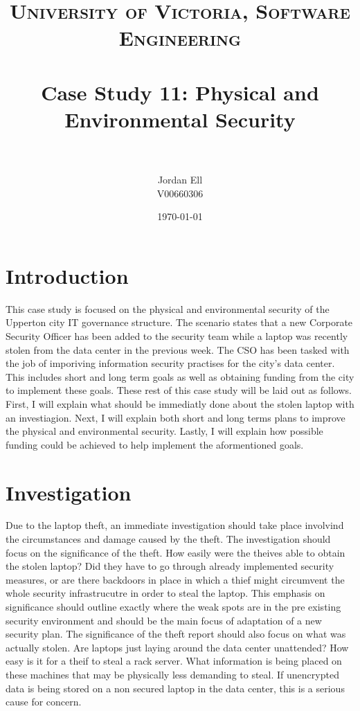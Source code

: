 \documentclass[paper=a4, fontsize=11pt]{scrartcl} %
\title{	
\normalfont \normalsize 
\textsc{University of Victoria, Software Engineering} \\ [25pt] %
\horrule{0.5pt} \\[0.4cm] %
\huge Case Study 11: Physical and Environmental Security \\ %
\horrule{2pt} \\[0.5cm] %
}
\author{Jordan Ell \\ V00660306} %
\date{\normalsize\today} %
\numberwithin{equation}{section} %
\numberwithin{figure}{section} %
\numberwithin{table}{section} %
\begin{document}
\maketitle %


\section{Introduction}

This case study is focused on the physical and environmental security of the Upperton city
IT governance structure. The scenario states that a new Corporate Security Officer has been
added to the security team while a laptop was recently stolen from the data center in the 
previous week. The CSO has been tasked with the job of imporiving information security practises
for the city's data center. This includes short and long term goals as well as obtaining funding
from the city to implement these goals. These rest of this case study will be laid out as follows.
First, I will explain what should be immediatly done about the stolen laptop with an investiagion.
Next, I will explain both short and long terms plans to improve the physical and environmental
security. Lastly, I will explain how possible funding could be achieved to help implement the
aformentioned goals.


\section{Investigation}

Due to the laptop theft, an immediate investigation should take place involvind the circumstances
and damage caused by the theft. The investigation should focus on the significance of the theft.
How easily were the theives able to obtain the stolen laptop? Did they have to go through 
already implemented security measures, or are there backdoors in place in which a thief might
circumvent the whole security infrastrucutre in order to steal the laptop. This emphasis on significance
should outline exactly where the weak spots are in the pre existing security environment and should
be the main focus of adaptation of a new security plan. The significance of the theft report should
also focus on what was actually stolen. Are laptops just laying around the data center unattended?
How easy is it for a theif to steal a rack server. What information is being placed on these machines
that may be physically less demanding to steal. If unencrypted data is being stored on a non secured
laptop in the data center, this is a serious cause for concern.\\
\end{document}
